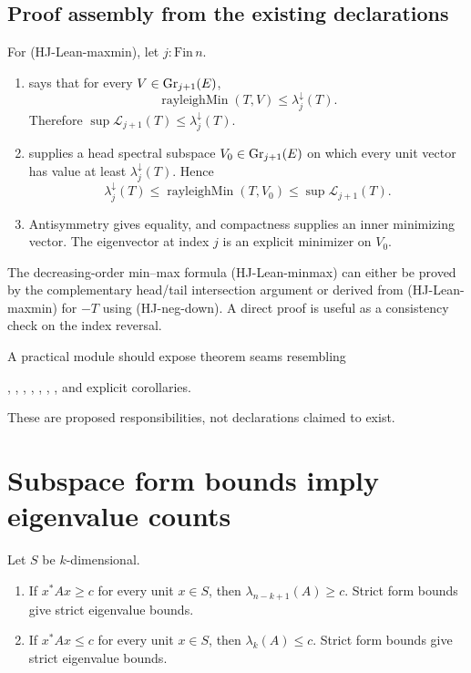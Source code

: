 \subsection{Proof assembly from the existing declarations}

For (HJ-Lean-maxmin), let $j:\mathrm{Fin}\,n$.
\begin{enumerate}[leftmargin=2em]
\item {} says that for every $V\in\operatorname{Gr}_{j+1}(E)$,
\[
  \operatorname{rayleighMin}(T,V)\le\lambda_j^{\downarrow}(T).
\]
Therefore $\sup\mathcal{L}_{j+1}(T)\le\lambda_j^{\downarrow}(T)$.
\item {} supplies a head spectral subspace $V_0\in\operatorname{Gr}_{j+1}(E)$ on which every unit vector has value at least $\lambda_j^{\downarrow}(T)$. Hence
\[
  \lambda_j^{\downarrow}(T)\le\operatorname{rayleighMin}(T,V_0)
  \le\sup\mathcal{L}_{j+1}(T).
\]
\item Antisymmetry gives equality, and compactness supplies an inner minimizing vector. The eigenvector at index $j$ is an explicit minimizer on $V_0$.
\end{enumerate}
The decreasing-order min--max formula (HJ-Lean-minmax) can either be proved by the complementary head/tail intersection argument or derived from (HJ-Lean-maxmin) for $-T$ using (HJ-neg-down). A direct proof is useful as a consistency check on the index reversal.

A practical module should expose theorem seams resembling
\begin{center}
, , ,
, ,
, ,
and explicit  corollaries.
\end{center}
These are proposed responsibilities, not declarations claimed to exist.

\section{Subspace form bounds imply eigenvalue counts}


\begin{theorem}
Let $S$ be $k$-dimensional.
\begin{enumerate}[label=(\alph*),leftmargin=2em]
\item If $x^*Ax\ge c$ for every unit $x\in S$, then $\lambda_{n-k+1}(A)\ge c$. Strict form bounds give strict eigenvalue bounds.
\item If $x^*Ax\le c$ for every unit $x\in S$, then $\lambda_k(A)\le c$. Strict form bounds give strict eigenvalue bounds.
\end{enumerate}
\end{theorem}

